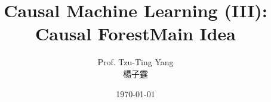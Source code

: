 \documentclass[dvipsnames,hyperref={pdfpagelabels=false}]{beamer}
\title[]
{Causal Machine Learning (III): Causal Forest}
\author
{Prof. Tzu-Ting Yang  \\ 楊子霆}
\institute{Institute of Economics, Academia Sinica  \\ 中央研究院經濟研究所}
\date
{\today}
\begin{document}
\begin{frame}{}
	\titlepage
\end{frame}




\title[]
{Main Idea}

\author{}
\institute{}
\date{}

\begin{frame}{}
	\titlepage
\end{frame}




\end{document}
